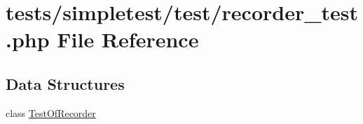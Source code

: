 \hypertarget{recorder__test_8php}{\section{tests/simpletest/test/recorder\-\_\-test.php File Reference}
\label{recorder__test_8php}
}
\subsection*{Data Structures}
\begin{DoxyCompactItemize}
\item 
class \hyperlink{class_test_of_recorder}{Test\-Of\-Recorder}
\end{DoxyCompactItemize}
